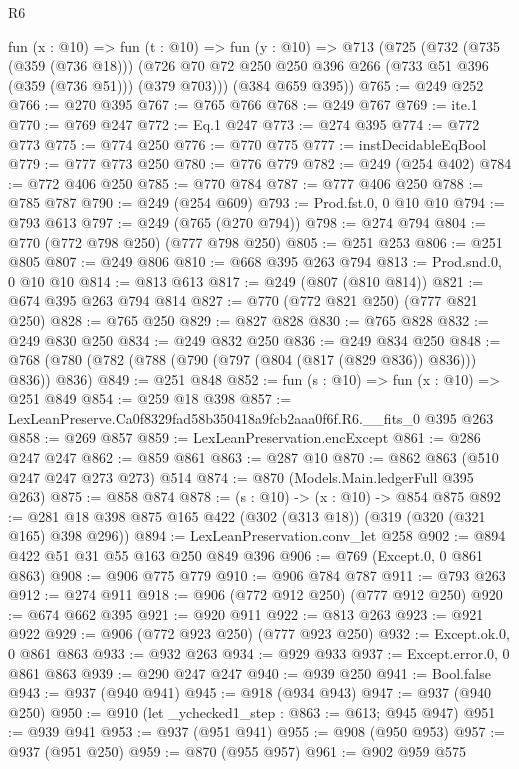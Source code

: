 \begin{lexlean}{R6}
\begin{coremodule}
  fun (x : @10) =>
  fun (t : @10) =>
  fun (y : @10) =>
  @713
    (@725
      (@732
        (@735 (@359 (@736 @18)))
        (@726 @70 @72 @250 @250 @396 @266 (@733 @51 @396 (@359 (@736 @51))) (@379 @703)))
      (@384 @659 @395))
@765 := @249 @252
@766 := @270 @395
@767 := @765 @766
@768 := @249 @767
@769 := ite.{1}
@770 := @769 @247
@772 := Eq.{1} @247
@773 := @274 @395
@774 := @772 @773
@775 := @774 @250
@776 := @770 @775
@777 := instDecidableEqBool
@779 := @777 @773 @250
@780 := @776 @779
@782 := @249 (@254 @402)
@784 := @772 @406 @250
@785 := @770 @784
@787 := @777 @406 @250
@788 := @785 @787
@790 := @249 (@254 @609)
@793 := Prod.fst.{0, 0} @10 @10
@794 := @793 @613
@797 := @249 (@765 (@270 @794))
@798 := @274 @794
@804 := @770 (@772 @798 @250) (@777 @798 @250)
@805 := @251 @253
@806 := @251 @805
@807 := @249 @806
@810 := @668 @395 @263 @794
@813 := Prod.snd.{0, 0} @10 @10
@814 := @813 @613
@817 := @249 (@807 (@810 @814))
@821 := @674 @395 @263 @794 @814
@827 := @770 (@772 @821 @250) (@777 @821 @250)
@828 := @765 @250
@829 := @827 @828
@830 := @765 @828
@832 := @249 @830 @250
@834 := @249 @832 @250
@836 := @249 @834 @250
@848 := @768 (@780 (@782 (@788 (@790 (@797 (@804 (@817 (@829 @836)) @836))) @836)) @836)
@849 := @251 @848
@852 := fun (s : @10) => fun (x : @10) => @251 @849
@854 := @259 @18 @398
@857 := LexLeanPreserve.Ca0f8329fad58b350418a9fcb2aaa0f6f.R6.__fits_0 @395 @263
@858 := @269 @857
@859 := LexLeanPreservation.encExcept
@861 := @286 @247 @247
@862 := @859 @861
@863 := @287 @10
@870 := @862 @863 (@510 @247 @247 @273 @273) @514
@874 := @870 (Models.Main.ledgerFull @395 @263)
@875 := @858 @874
@878 := (s : @10) -> (x : @10) -> @854 @875
@892 := @281 @18 @398 @875 @165 @422 (@302 (@313 @18)) (@319 (@320 (@321 @165) @398 @296))
@894 := LexLeanPreservation.conv_let @258
@902 := @894 @422 @51 @31 @55 @163 @250 @849 @396
@906 := @769 (Except.{0, 0} @861 @863)
@908 := @906 @775 @779
@910 := @906 @784 @787
@911 := @793 @263
@912 := @274 @911
@918 := @906 (@772 @912 @250) (@777 @912 @250)
@920 := @674 @662 @395
@921 := @920 @911
@922 := @813 @263
@923 := @921 @922
@929 := @906 (@772 @923 @250) (@777 @923 @250)
@932 := Except.ok.{0, 0} @861 @863
@933 := @932 @263
@934 := @929 @933
@937 := Except.error.{0, 0} @861 @863
@939 := @290 @247 @247
@940 := @939 @250
@941 := Bool.false
@943 := @937 (@940 @941)
@945 := @918 (@934 @943)
@947 := @937 (@940 @250)
@950 := @910 (let _ychecked1_step : @863 := @613; @945 @947)
@951 := @939 @941
@953 := @937 (@951 @941)
@955 := @908 (@950 @953)
@957 := @937 (@951 @250)
@959 := @870 (@955 @957)
@961 := @902 @959 @575

\end{coremodule}
\end{lexlean}
